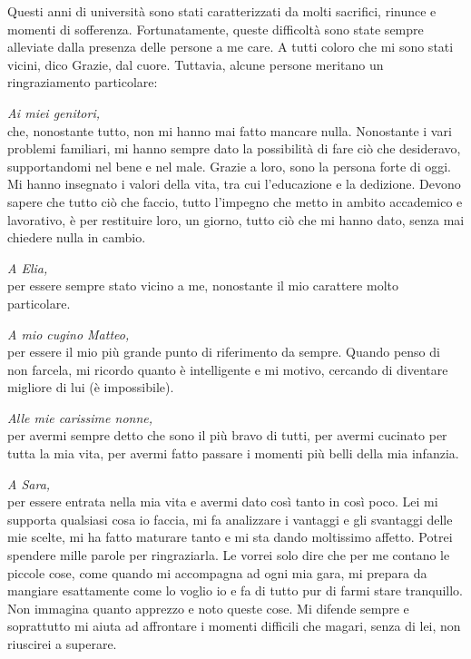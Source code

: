 \documentclass[twoside]{article}
\begin{document}
\vspace{\baselineskip}


Questi anni di università sono stati caratterizzati da molti sacrifici, rinunce e momenti di sofferenza. Fortunatamente, queste difficoltà sono state sempre alleviate dalla presenza delle persone a me care. A tutti coloro che mi sono stati vicini, dico Grazie, dal cuore. Tuttavia, alcune persone meritano un ringraziamento particolare:

\vspace{\baselineskip}

\textit{Ai miei genitori,}\\
che, nonostante tutto, non mi hanno mai fatto mancare nulla. Nonostante i vari problemi familiari, mi hanno sempre dato la possibilità di fare ciò che desideravo, supportandomi nel bene e nel male. Grazie a loro, sono la persona forte di oggi. Mi hanno insegnato i valori della vita, tra cui l'educazione e la dedizione. Devono sapere che tutto ciò che faccio, tutto l'impegno che metto in ambito accademico e lavorativo, è per restituire loro, un giorno, tutto ciò che mi hanno dato, senza mai chiedere nulla in cambio.

\vspace{\baselineskip}

\textit{A Elia,}\\
per essere sempre stato vicino a me, nonostante il mio carattere molto particolare.

\vspace{\baselineskip}

\textit{A mio cugino Matteo,}\\
per essere il mio più grande punto di riferimento da sempre. Quando penso di non farcela, mi ricordo quanto è intelligente e mi motivo, cercando di diventare migliore di lui (è impossibile).

\vspace{\baselineskip}

\textit{Alle mie carissime nonne,}\\
per avermi sempre detto che sono il più bravo di tutti, per avermi cucinato per tutta la mia vita, per avermi fatto passare i momenti più belli della mia infanzia.

\vspace{\baselineskip}

\textit{A Sara,}\\
per essere entrata nella mia vita e avermi dato così tanto in così poco. Lei mi supporta qualsiasi cosa io faccia, mi fa analizzare i vantaggi e gli svantaggi delle mie scelte, mi ha fatto maturare tanto e mi sta dando moltissimo affetto. Potrei spendere mille parole per ringraziarla. Le vorrei solo dire che per me contano le piccole cose, come quando mi accompagna ad ogni mia gara, mi prepara da mangiare esattamente come lo voglio io e fa di tutto pur di farmi stare tranquillo. Non immagina quanto apprezzo e noto queste cose. Mi difende sempre e soprattutto mi aiuta ad affrontare i momenti difficili che magari, senza di lei, non riuscirei a superare.
\end{document}
